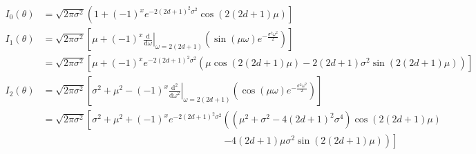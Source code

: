 \begin{align*}
	I_0\left( \theta \right) &= \sqrt{2 \pi \sigma^2} \left( 1 + \left( -1 \right) ^{x}e^{- 2 \left( 2d+1 \right)^2 \sigma^2} \cos\left( 2\left( 2d+1 \right) \mu \right)  \right] \\
	I_1(\theta) &= \sqrt{2 \pi \sigma^2}\left[ \mu + (-1)^{x} \left. \frac{\text{d}}{\text{d} \omega}  \right\vert_{\omega =2(2d+1) } \left( \sin \left( \mu \omega \right)  e^{ - \frac{\sigma^2 \omega^2}{2}} \right)  \right]  \\
		    &= \sqrt{2\pi \sigma^2} \left[ \mu + \left( -1 \right) ^{x}e^{ - 2\left( 2d+1 \right) ^2 \sigma^2} \left( \mu \cos\left( 2\left( 2d+1 \right) \mu \right)  - 2\left( 2d+1 \right) \sigma^2 \sin \left( 2\left( 2d+1 \right) \mu \right)  \right) \right] \\
		I_2\left( \theta \right) & = \sqrt{2 \pi \sigma^2} \left[ \sigma^2 + \mu^2 - \left( -1 \right) ^{x} \left. \frac{\text{d}^2}{\text{d}\omega^2} \right\vert_{\omega = 2\left( 2d+1 \right) }\left( \cos\left( \mu \omega \right) e^{- \frac{\sigma^2 \omega^2}{2}} \right)  \right]\\
					 &= \sqrt{2 \pi\sigma^2} \left[ \sigma^2 + \mu^2 + \left( -1 \right) ^{x} e^{- 2\left( 2d+1 \right) ^2 \sigma^2}\left( \left( \mu^2 + \sigma^2- 4\left( 2d+1 \right) ^2\sigma^{4} \right) \cos\left( 2\left( 2d+1 \right) \mu \right) \right. \right. \\
					 & \hspace{225pt} \left. \left.   - 4\left( 2d+1 \right) \mu\sigma^2 \sin\left( 2\left( 2d+1 \right) \mu \right)  \right) \right]
\end{align*}

